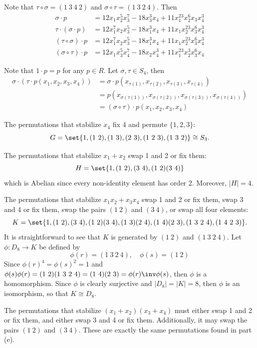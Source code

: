 \begin{solalph}
    \item Note that $\tau \circ \sigma = (1\ 3\ 4\ 2)$ and $\sigma \circ \tau = (1\ 3\ 2\ 4)$. Then
    \begin{align*}
        \sigma \cdot p & = 12x_1x_2^5x_3^7 - 18x_3^3x_4 + 11x_1^{23}x_2^6x_3x_4^3 \\
        \tau \cdot (\sigma \cdot p) & = 12x_1^7x_2x_3^5 - 18x_1^3x_4 + 11x_1x_2^{23}x_3^6x_4^3 \\
        (\tau \circ \sigma) \cdot p & = 12x_1^7x_2x_3^5 - 18x_1^3x_4 + 11x_1x_2^{23}x_3^6x_4^3  \\
        (\sigma \circ \tau) \cdot p & = 12x_1x_3^5x_4^7 - 18x_2x_4^3 + 11x_1^{23}x_2^3x_3^6x_4
    \end{align*}
    \item Note that $1 \cdot p = p$ for any $p \in R$. Let $\sigma, \tau \in S_4$, then
    \begin{align*}
        \sigma \cdot (\tau \cdot p(x_1, x_2, x_3, x_4)) & = \sigma \cdot p(x_{\tau(1)}, x_{\tau(2)}, x_{\tau(3)}, x_{\tau(4)}) \\
        & = p(x_{\sigma(\tau(1))}, x_{\sigma(\tau(2))}, x_{\sigma(\tau(3))}, x_{\sigma(\tau(4))}) \\
        & = (\sigma \circ \tau) \cdot p(x_1, x_2, x_3, x_4)
    \end{align*}
    \item The permutations that stabilize $x_4$ fix 4 and permute $\{1, 2, 3\}$:
    \[G = \set{1, (1\ 2), (1\ 3), (2\ 3), (1\ 2\ 3), (1\ 3\ 2)} \cong S_3.\]
    \item The permutations that stabilize $x_1 + x_2$ swap 1 and 2 or fix them:
    \[H = \set{1, (1\ 2), (3\ 4), (1\ 2)(3\ 4)}\]
    which is Abelian since every non-identity element has order 2. Moreover, $|H| = 4$.
    \item The permutations that stabilize $x_1x_2 + x_3x_4$ swap 1 and 2 or fix them, swap 3 and 4 or fix them, swap the pairs $(1\ 2)$ and $(3\ 4)$, or swap all four elements:
    \[K = \set{1, (1\ 2), (3\ 4), (1\ 2)(3\ 4), (1\ 3)(2\ 4), (1\ 4)(2\ 3), (1\ 3\ 2\ 4), (1\ 4\ 2\ 3)}.\]
    It is straightforward to see that $K$ is generated by $(1\ 2)$ and $(1\ 3\ 2\ 4)$. Let $\phi : D_8 \to K$ be defined by
    \[\phi(r) = (1\ 3\ 2\ 4), \quad \phi(s) = (1\ 2)\]
    Since $\phi(r)^4 = \phi(s)^2 = 1$ and $\phi(s) \phi(r) = (1\ 2)(1\ 3\ 2\ 4) = (1\ 4)(2\ 3) = \phi(r)\inv \phi(s)$, then $\phi$ is a homomorphism. Since $\phi$ is clearly surjective and $|D_8| = |K| = 8$, then $\phi$ is an isomorphism, so that $K \cong D_8$.
    \item The permutations that stabilize $(x_1 + x_2)(x_3 + x_4)$ must either swap 1 and 2 or fix them, and either swap 3 and 4 or fix them. Additionally, it may swap the pairs $(1\ 2)$ and $(3\ 4)$. These are exactly the same permutations found in part (e). \qh
\end{solalph}


